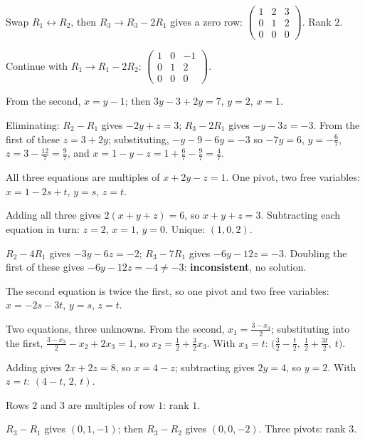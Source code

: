 \begin{solutions}
  \item Swap $R_{1}\leftrightarrow R_{2}$, then $R_{3}\to R_{3}-2R_{1}$
        gives a zero row:
        $\begin{pmatrix}1&2&3\\0&1&2\\0&0&0\end{pmatrix}$. Rank $2$.
  \item Continue with $R_{1}\to R_{1}-2R_{2}$:
        $\begin{pmatrix}1&0&-1\\0&1&2\\0&0&0\end{pmatrix}$.
  \item From the second, $x=y-1$; then $3y-3+2y=7$, $y=2$, $x=1$.
  \item Eliminating: $R_{2}-R_{1}$ gives $-2y+z=3$; $R_{3}-2R_{1}$ gives
        $-y-3z=-3$. From the first of these $z=3+2y$; substituting,
        $-y-9-6y=-3$ so $-7y=6$, $y=-\tfrac67$,
        $z=3-\tfrac{12}{7}=\tfrac97$, and
        $x=1-y-z=1+\tfrac67-\tfrac97=\tfrac47$.
  \item All three equations are multiples of $x+2y-z=1$. One pivot, two
        free variables: $x=1-2s+t$, $y=s$, $z=t$.
  \item Adding all three gives $2(x+y+z)=6$, so $x+y+z=3$. Subtracting each
        equation in turn: $z=2$, $x=1$, $y=0$. Unique: $(1,0,2)$.
  \item $R_{2}-4R_{1}$ gives $-3y-6z=-2$; $R_{3}-7R_{1}$ gives
        $-6y-12z=-3$. Doubling the first of these gives $-6y-12z=-4\neq-3$:
        \textbf{inconsistent}, no solution.
  \item The second equation is twice the first, so one pivot and two free
        variables: $x=-2s-3t$, $y=s$, $z=t$.
  \item Two equations, three unknowns. From the second,
        $x_{1}=\tfrac{3-x_{3}}{2}$; substituting into the first,
        $\tfrac{3-x_{3}}{2}-x_{2}+2x_{3}=1$, so
        $x_{2}=\tfrac12+\tfrac32x_{3}$. With $x_{3}=t$:
        $\bigl(\tfrac32-\tfrac t2,\ \tfrac12+\tfrac{3t}{2},\ t\bigr)$.
  \item Adding gives $2x+2z=8$, so $x=4-z$; subtracting gives $2y=4$, so
        $y=2$. With $z=t$: $(4-t,\,2,\,t)$.
  \item Rows $2$ and $3$ are multiples of row $1$: rank $1$.
  \item $R_{3}-R_{1}$ gives $(0,1,-1)$; then $R_{3}-R_{2}$ gives
        $(0,0,-2)$. Three pivots: rank $3$.

\end{solutions}
